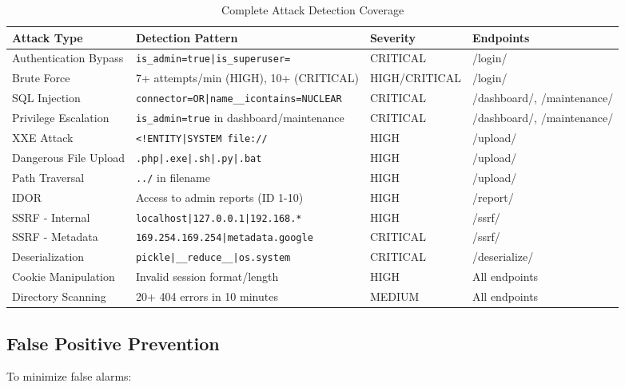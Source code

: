 \documentclass[12pt,a4paper]{article}
\begin{document}
\begin{table}[h]
\centering
\small
\begin{tabular}{|p{3cm}|p{5cm}|p{2cm}|p{2cm}|}
\hline
\textbf{Attack Type} & \textbf{Detection Pattern} & \textbf{Severity} & \textbf{Endpoints} \\
\hline
Authentication Bypass & \texttt{is\_admin=true|is\_superuser=} & CRITICAL & /login/ \\
\hline
Brute Force & 7+ attempts/min (HIGH), 10+ (CRITICAL) & HIGH/CRITICAL & /login/ \\
\hline
SQL Injection & \texttt{connector=OR|name\_\_icontains=NUCLEAR} & CRITICAL & /dashboard/, /maintenance/ \\
\hline
Privilege Escalation & \texttt{is\_admin=true} in dashboard/maintenance & CRITICAL & /dashboard/, /maintenance/ \\
\hline
XXE Attack & \texttt{<!ENTITY|SYSTEM file://} & HIGH & /upload/ \\
\hline
Dangerous File Upload & \texttt{.php|.exe|.sh|.py|.bat} & HIGH & /upload/ \\
\hline
Path Traversal & \texttt{../} in filename & HIGH & /upload/ \\
\hline
IDOR & Access to admin reports (ID 1-10) & HIGH & /report/ \\
\hline
SSRF - Internal & \texttt{localhost|127.0.0.1|192.168.*} & HIGH & /ssrf/ \\
\hline
SSRF - Metadata & \texttt{169.254.169.254|metadata.google} & CRITICAL & /ssrf/ \\
\hline
Deserialization & \texttt{pickle|\_\_reduce\_\_|os.system} & CRITICAL & /deserialize/ \\
\hline
Cookie Manipulation & Invalid session format/length & HIGH & All endpoints \\
\hline
Directory Scanning & 20+ 404 errors in 10 minutes & MEDIUM & All endpoints \\
\hline
\end{tabular}
\caption{Complete Attack Detection Coverage}
\end{table}

\subsection{False Positive Prevention}

To minimize false alarms:
\end{document}
